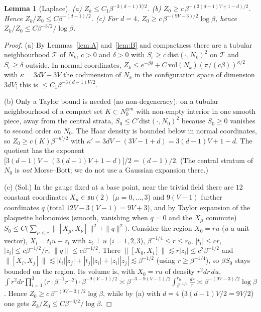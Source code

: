 \documentclass[11pt,a4paper]{article}
\theoremstyle{plain}
\newtheorem{lemma}[theorem]{Lemma}
\theoremstyle{definition}
\theoremstyle{remark}
\numberwithin{equation}{section}
\begin{document}
\begin{lemma}[Laplace]\label{lem:C}
(a) $Z_k\le C_1\beta^{-3(d-1)V/2}$. (b) $Z_0\ge c\,\beta^{-(3(d-1)V+1-d)/2}$. Hence $Z_k/Z_0\le C\beta^{-(d-1)/2}$. (c) For $d=4$, $Z_0\ge c\,\beta^{-(9V-3)/2}\log\beta$, hence $Z_k/Z_0\le C\beta^{-3/2}/\log\beta$.
\end{lemma}
\begin{proof}
(a) By Lemmas~\ref{lem:A} and~\ref{lem:B} and compactness there are a tubular neighbourhood $\mathcal T$ of $N_k$, $c>0$ and $\delta>0$ with $S_\epsilon\ge c\,\mathrm{dist}(\cdot,N_k)^2$ on $\mathcal T$ and $S_\epsilon\ge\delta$ outside. In normal coordinates, $Z_k\le e^{-\beta\delta}+C\,\mathrm{vol}(N_k)(\pi/(c\beta))^{\kappa/2}$ with $\kappa=3dV-3V$ the codimension of $N_k$ in the configuration space of dimension $3dV$; this is $\le C_1\beta^{-3(d-1)V/2}$.

(b) Only a Taylor bound is needed (no non-degeneracy): on a tubular neighbourhood of a compact set $K\subset N_0^{\mathrm{gen}}$ with non-empty interior in one smooth piece, away from the central strata, $S_0\le C'\mathrm{dist}(\cdot,N_0)^2$ because $S_0\ge0$ vanishes to second order on $N_0$. The Haar density is bounded below in normal coordinates, so $Z_0\ge c(K)\beta^{-\kappa'/2}$ with $\kappa'=3dV-(3V-1+d)=3(d-1)V+1-d$. The quotient has the exponent $\bigl[3(d-1)V-(3(d-1)V+1-d)\bigr]/2=(d-1)/2$. (The central stratum of $N_0$ is \emph{not} Morse--Bott; we do not use a Gaussian expansion there.)

(c) (Sol.) In the gauge fixed at a base point, near the trivial field there are $12$ constant coordinates $X_\mu\in\mathfrak{su}(2)$ ($\mu=0,\dots,3$) and $9(V-1)$ further coordinates $q$ (total $12V-3(V-1)=9V+3$), and by Taylor expansion of the plaquette holonomies (smooth, vanishing when $q=0$ and the $X_\mu$ commute) $S_0\le C\bigl(\sum_{\mu<\nu}\|[X_\mu,X_\nu]\|^2+\|q\|^2\bigr)$. Consider the region $X_0=ru$ ($u$ a unit vector), $X_i=t_iu+z_i$ with $z_i\perp u$ ($i=1,2,3$), $\beta^{-1/4}\le r\le r_0$, $|t_i|\le cr$, $|z_i|\le c\beta^{-1/2}/r$, $\|q\|\le c\beta^{-1/2}$. There $\|[X_0,X_i]\|\lesssim r|z_i|\le c^2\beta^{-1/2}$ and $\|[X_i,X_j]\|\lesssim|t_i||z_j|+|t_j||z_i|+|z_i||z_j|\lesssim\beta^{-1/2}$ (using $r\ge\beta^{-1/4}$), so $\beta S_0$ stays bounded on the region. Its volume is, with $X_0=ru$ of density $r^2dr\,du$, $\int r^2dr\prod_{i=1}^3\bigl(r\cdot\beta^{-1}r^{-2}\bigr)\cdot\beta^{-9(V-1)/2}\asymp\beta^{-3-9(V-1)/2}\int_{\beta^{-1/4}}^{r_0}\frac{dr}{r}\asymp\beta^{-(9V-3)/2}\log\beta$. Hence $Z_0\ge c\,\beta^{-(9V-3)/2}\log\beta$, while by (a) with $d=4$ ($3(d-1)V/2=9V/2$) one gets $Z_k/Z_0\le C\beta^{-3/2}/\log\beta$.
\end{proof}
\end{document}

